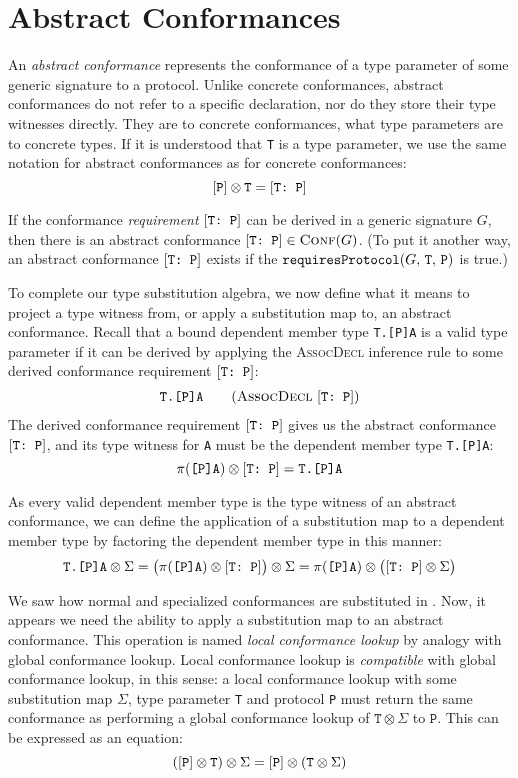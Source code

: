 \documentclass[../generics]{subfiles}
\begin{document}
\section{Abstract Conformances}\label{abstract conformances}

An \emph{abstract conformance} represents the conformance of a type parameter of some generic signature to a protocol. Unlike concrete conformances, abstract conformances do not refer to a specific declaration, nor do they store their type witnesses directly. They are to concrete conformances, what type parameters are to concrete types. If it is understood that \texttt{T} is a type parameter, we use the same notation for abstract conformances as for concrete conformances:
\[[\texttt{P}]\otimes\texttt{T} = [\texttt{T:~P}]\]

If the conformance \emph{requirement} $[\texttt{T:~P}]$ can be derived in a generic signature $G$, then there is an abstract conformance $[\texttt{T:~P}]\in\textsc{Conf}({G})$. (To put it another way, an abstract conformance $[\texttt{T:~P}]$ exists if the $\texttt{requiresProtocol}(G,\,\texttt{T},\,\texttt{P})$ is true.)

To complete our type substitution algebra, we now define what it means to project a type witness from, or apply a substitution map to, an abstract conformance. Recall that a bound dependent member type \texttt{T.[P]A} is a valid type parameter if it can be derived by applying the \textsc{AssocDecl} inference rule to some derived conformance requirement $[\texttt{T:~P}]$:
\begin{gather*}
\AssocDeclStepDef
\end{gather*}
The derived conformance requirement $[\texttt{T:~P}]$ gives us the abstract conformance $[\texttt{T:~P}]$, and its type witness for \texttt{A} must be the dependent member type \texttt{T.[P]A}:
\[\pi(\texttt{[P]A}) \otimes [\texttt{T:~P}] = \texttt{T.[P]A}\]

As every valid dependent member type is the type witness of an abstract conformance, we can define the application of a substitution map to a dependent member type by factoring the dependent member type in this manner:
\[\texttt{T.[P]A}\otimes\Sigma=\bigl(\pi(\texttt{[P]A}) \otimes [\texttt{T:~P}]\bigr)\otimes\Sigma=\pi(\texttt{[P]A})\otimes\bigl([\texttt{T:~P}]\otimes\Sigma\bigr)\]

We saw how normal and specialized conformances are substituted in . Now, it appears we need the ability to apply a substitution map to an abstract conformance. This operation is named \emph{local conformance lookup} by analogy with global conformance lookup. Local conformance lookup is \emph{compatible} with global conformance lookup, in this sense: a local conformance lookup with some substitution map $\Sigma$, type parameter \texttt{T} and protocol \texttt{P} must return the same conformance as performing a global conformance lookup of $\texttt{T}\otimes\Sigma$ to $\texttt{P}$. This can be expressed as an equation:
\[([\texttt{P}]\otimes\texttt{T})\otimes\Sigma=[\texttt{P}]\otimes(\texttt{T}\otimes\Sigma)\]
\end{document}
